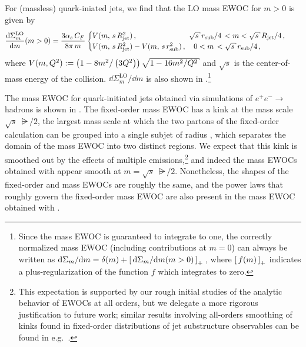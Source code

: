 For (massless) quark-iniated jets, we find that the LO mass EWOC for \(m > 0\) is given by
\begin{align}
    \frac{\dd\Sigma^\text{LO}_m}{\dd m}(m > 0)
    &=
    \frac{3 \alpha_s \, C_F}{8\pi\, m}
    \begin{cases}
        V(m, \, s\,\Rjet^2)
        \,,
        \quad\qquad\qquad\qquad
        \sqrt{s}\,\rsub/4
        \, <
        m
        <
        \sqrt{s}\,\Rjet/4
        \,,
        \\
        V(m, \, s\,\Rjet^2)
        -
        V(m, \, s\,\rsub^2)
        \,,
        \quad
        0 < m \, < \sqrt{s}\,\rsub/4
        \,,
    \end{cases}
\end{align}
where \(
    V(m, Q^2)
    :=
    \le(1 - 8 m^2 / \le(3 Q^2\ri)\ri)
    \sqrt{1 - 16 m^2 / Q^2}
\) and $\sqrt{s}$ is the center-of-mass energy of the collision.
%
\(\dd \Sigma^\text{LO}_m / \dd m\) is also shown in .\footnote{
    Since the mass EWOC is guaranteed to integrate to one, the correctly normalized mass EWOC (including contributions at \(m=0\)) can always be written as \(
        \dd\Sigma_m / \dd m
        =
        \delta(m)
        +
        \left[ \,
        \dd\Sigma_m / \dd m (m > 0)
        \, \right]_+
        \,
    \), where \(\left[ \, f(m) \, \right]_+\) indicates a plus-regularization of the function \(f\) which integrates to zero.
}

The mass EWOC for quark-initiated jets obtained via \pythia{} simulations of \(e^+e^-\to\,\)hadrons is shown in .
%
The fixed-order mass EWOC has a kink at the mass scale \(\sqrt{s}\,\,\rsub/2\),
the largest mass scale at which the two partons of the fixed-order calculation can be grouped into a single subjet of radius \rsub{}, which separates the domain of the mass EWOC into two distinct regions.
%
We expect that this kink is smoothed out by the effects of multiple emissions,\footnote{
    This expectation is supported by our rough initial studies of the analytic behavior of EWOCs at all orders, but we delegate a more rigorous justification to future work;
    similar results involving all-orders smoothing of kinks found in fixed-order distributions of jet substructure observables can be found in e.g.~.
} and indeed the mass EWOCs obtained with \pythia{} appear smooth at \(m = \sqrt{s}\,\,\rsub/2\).
%
Nonetheless, the shapes of the fixed-order and \pythia{} mass EWOCs are roughly the same, and the power laws that roughly govern the fixed-order mass EWOC are also present in the mass EWOC obtained with \pythia{}.

